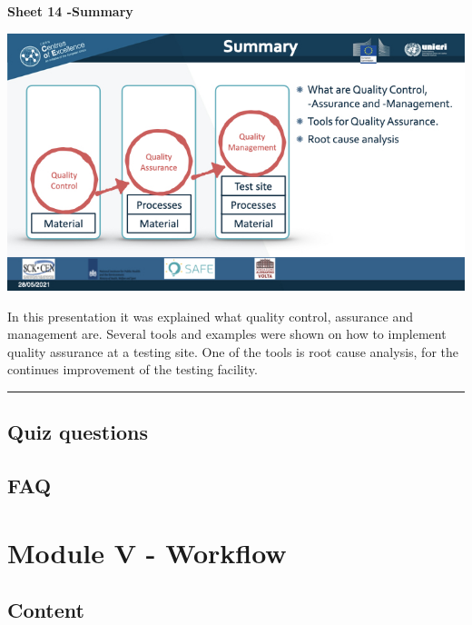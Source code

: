 \documentclass[
]{book}
\begin{document}
\textbf{Sheet 14 -Summary}

\includegraphics{images/m04/m04_Quality_management_v3.014.jpeg}

In this presentation it was explained what quality control, assurance
and management are. Several tools and examples were shown on how to
implement quality assurance at a testing site. One of the tools is root
cause analysis, for the continues improvement of the testing facility.

\begin{center}\rule{0.5\linewidth}{0.5pt}\end{center}

\hypertarget{quiz-questions-2}{%
\subsection{Quiz questions}\label{quiz-questions-2}}

\hypertarget{faq-2}{%
\subsection{FAQ}\label{faq-2}}

\hypertarget{module-v---workflow}{%
\section{Module V - Workflow}\label{module-v---workflow}}

\hypertarget{content-3}{%
\subsection{Content}\label{content-3}}
\end{document}
